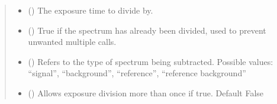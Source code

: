\documentclass[a4paper,10pt,english]{sphinxmanual}
\begin{document}
\begin{fulllineitems}
\begin{fulllineitems}
\begin{fulllineitems}
\begin{quote}
\begin{description}
\begin{itemize}
\item {} 
\sphinxAtStartPar
{} () \textendash{} The exposure time to divide by.

\item {} 
\sphinxAtStartPar
{} () \textendash{} True if the spectrum has already been divided, used to prevent unwanted multiple calls.

\item {} 
\sphinxAtStartPar
{} () \textendash{} Refers to the type of spectrum being subtracted. Possible values:
“signal”, “background”, “reference”, “reference background”

\item {} 
\sphinxAtStartPar
{} (\sphinxstyleliteralemphasis{\sphinxupquote{, }}) \textendash{} Allows exposure division more than once if true. Default False

\end{itemize}

\end{description}\end{quote}

\end{fulllineitems}


\begin{fulllineitems}
\label{\detokenize{sfgtools:sfgtools.SFGProcessTools.SFGDataStore.filename_bg}}
\end{fulllineitems}


\begin{fulllineitems}
\label{\detokenize{sfgtools:sfgtools.SFGProcessTools.SFGDataStore.filename_ref}}
\end{fulllineitems}


\end{fulllineitems}
\end{fulllineitems}
\end{document}
